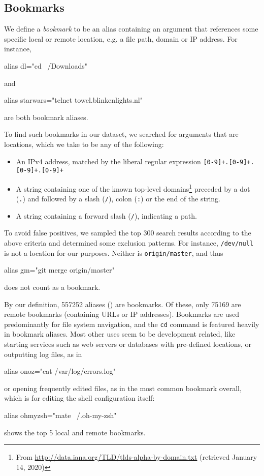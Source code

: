 \subsection{Bookmarks}

We define a \emph{bookmark} to be an alias containing an argument that references some specific local or remote location, e.g. a file path, domain or IP address.
For instance, 
\begin{CVerbatim}
alias dl="cd ~/Downloads"
\end{CVerbatim}
and
\begin{CVerbatim}
alias starwars="telnet towel.blinkenlights.nl"
\end{CVerbatim}
are both bookmark aliases.

To find such bookmarks in our dataset, we searched for arguments that are locations, which we take to be any of the following:
\begin{itemize}
    \item An IPv4 address, matched by the liberal regular expression \verb|[0-9]+.[0-9]+.[0-9]+.[0-9]+|
    \item A string containing one of the known top-level domains\footnote{From \url{http://data.iana.org/TLD/tlds-alpha-by-domain.txt} (retrieved January 14, 2020)} preceded by a dot (\verb|.|) and followed by a slash (\verb|/|), colon (\verb|:|) or the end of the string.
    \item A string containing a forward slash (\verb|/|), indicating a path.
\end{itemize}
To avoid false positives, we sampled the top 300 search results according to the above criteria and determined some exclusion patterns.
For instance, \texttt{/dev/null} is not a location for our purposes.
Neither is \texttt{origin/master}, and thus 
\begin{CVerbatim}
alias gm="git merge origin/master"
\end{CVerbatim}
does not count as a bookmark.

By our definition, \num{557252} aliases () are bookmarks.
Of these, only \num{75169} are remote bookmarks (containing URLs or IP addresses).
Bookmarks are used predominantly for file system navigation, and the \texttt{cd} command is featured heavily in bookmark aliases.
Most other uses seem to be development related, like starting services such as web servers or databases with pre-defined locations, or outputting log files, as in 
\begin{CVerbatim}
alias onoz="cat /var/log/errors.log"
\end{CVerbatim}
or opening frequently edited files, as in the most common bookmark overall, which is for editing the shell configuration itself:
\begin{CVerbatim}
alias ohmyzsh="mate ~/.oh-my-zsh"
\end{CVerbatim}
 shows the top 5 local and remote bookmarks.

